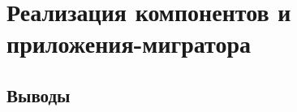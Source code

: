 \chapter{Реализация компонентов и приложения-мигратора} \label{ch:ch3}

\section{Выводы} \label{sec:conclusion}
